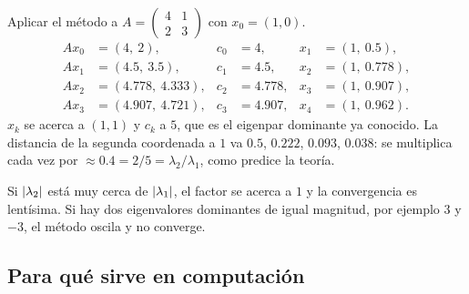 \documentclass[11pt,letterpaper]{article}
\begin{document}
\begin{ejemplo}
    Aplicar el método a
    $A = \begin{pmatrix} 4 & 1 \\ 2 & 3 \end{pmatrix}$ con
    $x_0 = (1, 0)$.
    \begin{align*}
        A x_0 &= (4,\ 2) ,
            & c_0 &= 4 ,
            & x_1 &= (1,\ 0.5) , \\
        A x_1 &= (4.5,\ 3.5) ,
            & c_1 &= 4.5 ,
            & x_2 &= (1,\ 0.778) , \\
        A x_2 &= (4.778,\ 4.333) ,
            & c_2 &= 4.778 ,
            & x_3 &= (1,\ 0.907) , \\
        A x_3 &= (4.907,\ 4.721) ,
            & c_3 &= 4.907 ,
            & x_4 &= (1,\ 0.962) .
    \end{align*}
    $x_k$ se acerca a $(1, 1)$ y $c_k$ a $5$, que es el eigenpar
    dominante ya conocido. La distancia de la segunda coordenada a $1$
    va $0.5$, $0.222$, $0.093$, $0.038$: se multiplica cada vez por
    $\approx 0.4 = 2/5 = \lambda_2 / \lambda_1$, como predice la
    teoría.
\end{ejemplo}

\begin{ojo}
    Si $\left\lvert \lambda_2 \right\rvert$ está muy cerca de $\left\lvert \lambda_1 \right\rvert$, el
    factor se acerca a $1$ y la convergencia es lentísima. Si hay dos
    eigenvalores dominantes de igual magnitud, por ejemplo $3$ y $-3$,
    el método oscila y no converge.
\end{ojo}


\subsection*{Para qué sirve en computación}
\end{document}
